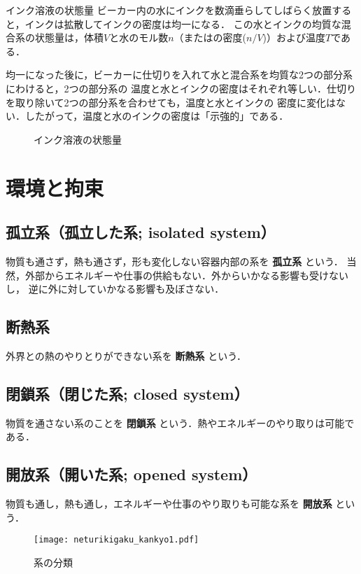         \begin{mysmallsec}{インク溶液の状態量}
            ビーカー内の水にインクを数滴垂らしてしばらく放置すると，インクは拡散してインクの密度は均一になる．
            この水とインクの均質な混合系の状態量は，体積$V$と水のモル数$n$（またはの密度($n/V$)）および温度$T$である．

            均一になった後に，ビーカーに仕切りを入れて水と混合系を均質な2つの部分系にわけると，2つの部分系の
            温度と水とインクの密度はそれぞれ等しい．仕切りを取り除いて2つの部分系を合わせても，温度と水とインクの
            密度に変化はない．したがって，温度と水のインクの密度は「示強的」である．

            \begin{figure}[hbt]
                \begin{center}
                    \caption{インク溶液の状態量}
                    \label{fig:netsu_shikyo_siryo}
                \end{center}
            \end{figure}
        \end{mysmallsec}

\section{環境と拘束}
    \subsection{孤立系（孤立した系; isolated system）}
        物質も通さず，熱も通さず，形も変化しない容器内部の系を \textbf{孤立系} という．
        当然，外部からエネルギーや仕事の供給もない．外からいかなる影響も受けないし，
        逆に外に対していかなる影響も及ぼさない．

    \subsection{断熱系}
        外界との熱のやりとりができない系を \textbf{断熱系} という．

    \subsection{閉鎖系（閉じた系; closed system）}
        物質を通さない系のことを \textbf{閉鎖系} という．熱やエネルギーのやり取りは可能である．

    \subsection{開放系（開いた系; opened system）}
        物質も通し，熱も通し，エネルギーや仕事のやり取りも可能な系を \textbf{開放系} という．
        \begin{figure}[hbt]
            \begin{center}
                \texttt{[image: neturikigaku\_kankyo1.pdf]}
                \caption{系の分類}
                \label{fig:neturikigaku_kankyo1}
            \end{center}
        \end{figure}

